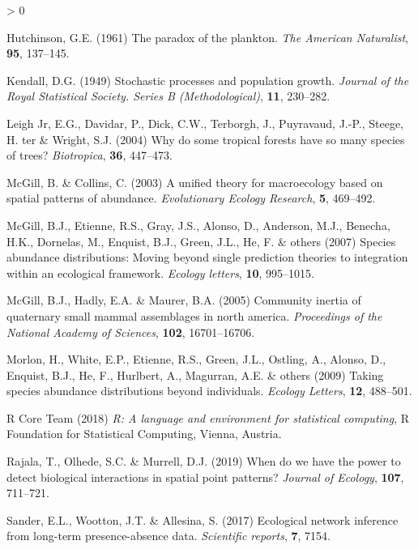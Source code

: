 \documentclass[
]{article}
\newlength{\cslhangindent}
\newenvironment{CSLReferences}[2] %
 {%
  \setlength{\parindent}{0pt}
  \ifodd #1 \everypar{\setlength{\hangindent}{\cslhangindent}}\ignorespaces\fi
  \ifnum #2 > 0
  \setlength{\parskip}{#2\baselineskip}
  \fi
 }%
 {}
\begin{document}
\begin{CSLReferences}{1}{0}
\leavevmode\hypertarget{ref-hutchinson1961}{}%
Hutchinson, G.E. (1961) The paradox of the plankton. \emph{The American
Naturalist}, \textbf{95}, 137--145.

\leavevmode\hypertarget{ref-kendall1949}{}%
Kendall, D.G. (1949) Stochastic processes and population growth.
\emph{Journal of the Royal Statistical Society. Series B
(Methodological)}, \textbf{11}, 230--282.

\leavevmode\hypertarget{ref-leigh2004}{}%
Leigh Jr, E.G., Davidar, P., Dick, C.W., Terborgh, J., Puyravaud, J.-P.,
Steege, H. ter \& Wright, S.J. (2004) Why do some tropical forests have
so many species of trees? \emph{Biotropica}, \textbf{36}, 447--473.

\leavevmode\hypertarget{ref-mcgill2003}{}%
McGill, B. \& Collins, C. (2003) A unified theory for macroecology based
on spatial patterns of abundance. \emph{Evolutionary Ecology Research},
\textbf{5}, 469--492.

\leavevmode\hypertarget{ref-mcgill2007}{}%
McGill, B.J., Etienne, R.S., Gray, J.S., Alonso, D., Anderson, M.J.,
Benecha, H.K., Dornelas, M., Enquist, B.J., Green, J.L., He, F. \&
others (2007) Species abundance distributions: Moving beyond single
prediction theories to integration within an ecological framework.
\emph{Ecology letters}, \textbf{10}, 995--1015.

\leavevmode\hypertarget{ref-mcgill2005}{}%
McGill, B.J., Hadly, E.A. \& Maurer, B.A. (2005) Community inertia of
quaternary small mammal assemblages in north america. \emph{Proceedings
of the National Academy of Sciences}, \textbf{102}, 16701--16706.

\leavevmode\hypertarget{ref-morlon2009}{}%
Morlon, H., White, E.P., Etienne, R.S., Green, J.L., Ostling, A.,
Alonso, D., Enquist, B.J., He, F., Hurlbert, A., Magurran, A.E. \&
others (2009) Taking species abundance distributions beyond individuals.
\emph{Ecology Letters}, \textbf{12}, 488--501.

\leavevmode\hypertarget{ref-rcore}{}%
R Core Team (2018) \emph{R: A language and environment for statistical
computing}, R Foundation for Statistical Computing, Vienna, Austria.

\leavevmode\hypertarget{ref-rajala2019}{}%
Rajala, T., Olhede, S.C. \& Murrell, D.J. (2019) When do we have the
power to detect biological interactions in spatial point patterns?
\emph{Journal of Ecology}, \textbf{107}, 711--721.

\leavevmode\hypertarget{ref-sander2017}{}%
Sander, E.L., Wootton, J.T. \& Allesina, S. (2017) Ecological network
inference from long-term presence-absence data. \emph{Scientific
reports}, \textbf{7}, 7154.


\end{CSLReferences}
\end{document}
